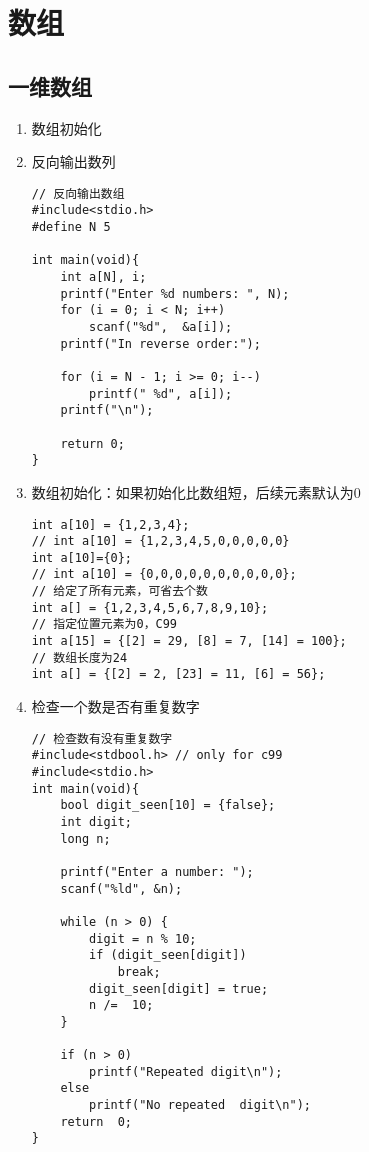 \documentclass{article}
\begin{document}
\section*{数组}
\subsection*{一维数组}
\begin{enumerate}

\item 数组初始化
\item 反向输出数列
    
\begin{lstlisting}
// 反向输出数组
#include<stdio.h>
#define N 5

int main(void){
    int a[N], i;
    printf("Enter %d numbers: ", N);
    for (i = 0; i < N; i++)
        scanf("%d",  &a[i]);
    printf("In reverse order:");
    
    for (i = N - 1; i >= 0; i--)
        printf(" %d", a[i]);
    printf("\n");

    return 0;
}
\end{lstlisting}

\item 数组初始化：如果初始化比数组短，后续元素默认为0

\begin{lstlisting}
int a[10] = {1,2,3,4};
// int a[10] = {1,2,3,4,5,0,0,0,0,0} 
int a[10]={0};
// int a[10] = {0,0,0,0,0,0,0,0,0,0};
// 给定了所有元素，可省去个数
int a[] = {1,2,3,4,5,6,7,8,9,10};
// 指定位置元素为0，C99
int a[15] = {[2] = 29, [8] = 7, [14] = 100};
// 数组长度为24
int a[] = {[2] = 2, [23] = 11, [6] = 56};
\end{lstlisting}

\item 检查一个数是否有重复数字

\begin{lstlisting}
// 检查数有没有重复数字
#include<stdbool.h> // only for c99
#include<stdio.h>
int main(void){
    bool digit_seen[10] = {false};
    int digit;
    long n;

    printf("Enter a number: ");
    scanf("%ld", &n);

    while (n > 0) {
        digit = n % 10;
        if (digit_seen[digit])
            break;
        digit_seen[digit] = true;
        n /=  10;
    }

    if (n > 0)
        printf("Repeated digit\n");
    else
        printf("No repeated  digit\n");
    return  0;
}
\end{lstlisting}

\end{enumerate}
\end{document}
